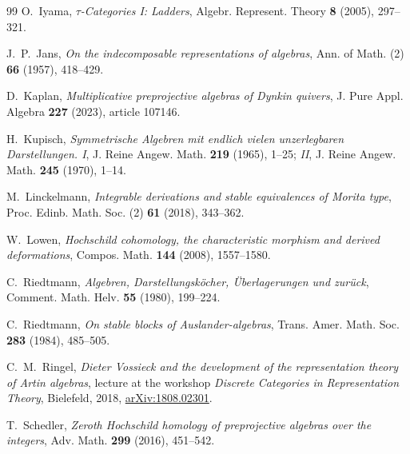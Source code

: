\documentclass[a4paper,reqno,11pt]{amsart}
\theoremstyle{definition}
\begin{document}
\begin{thebibliography}{99}
O.~Iyama,
\emph{$\tau$-Categories I: Ladders},
Algebr. Represent. Theory \textbf{8} (2005), 297--321.

J.~P.~Jans,
\emph{On the indecomposable representations of algebras},
Ann. of Math. (2) \textbf{66} (1957), 418--429.

D.~Kaplan,
\emph{Multiplicative preprojective algebras of Dynkin quivers},
J. Pure Appl. Algebra \textbf{227} (2023), article 107146.

H.~Kupisch,
\emph{Symmetrische Algebren mit endlich vielen unzerlegbaren
Darstellungen. I}, J. Reine Angew. Math. \textbf{219} (1965), 1--25;
\emph{II}, J. Reine Angew. Math. \textbf{245} (1970), 1--14.

M.~Linckelmann,
\emph{Integrable derivations and stable equivalences of Morita type},
Proc. Edinb. Math. Soc. (2) \textbf{61} (2018), 343--362.

W.~Lowen,
\emph{Hochschild cohomology, the characteristic morphism and derived deformations},
Compos. Math. \textbf{144} (2008), 1557--1580.

C.~Riedtmann,
\emph{Algebren, Darstellungsk\"ocher, \"Uberlagerungen und zur\"uck},
Comment. Math. Helv. \textbf{55} (1980), 199--224.

C.~Riedtmann,
\emph{On stable blocks of Auslander-algebras},
Trans. Amer. Math. Soc. \textbf{283} (1984), 485--505.

C.~M.~Ringel,
\emph{Dieter Vossieck and the development of the representation theory of
Artin algebras}, lecture at the workshop \emph{Discrete Categories in
Representation Theory}, Bielefeld, 2018,
\href{https://arxiv.org/abs/1808.02301}{arXiv:1808.02301}.

T.~Schedler,
\emph{Zeroth Hochschild homology of preprojective algebras over the integers},
Adv. Math. \textbf{299} (2016), 451--542.

\end{thebibliography}
\end{document}
